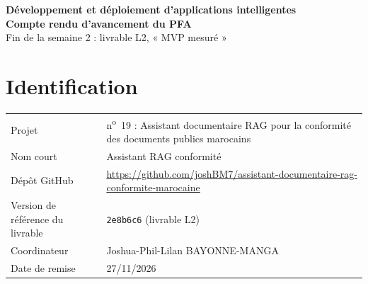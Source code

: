 \documentclass[11pt,a4paper]{article}
\newcommand{\NomCourt}{Assistant RAG conformité}
\newcommand{\NumProjet}{n\textsuperscript{o}~19}
\newcommand{\IntituleProjet}{Assistant documentaire RAG pour la conformité des documents publics marocains}
\newcommand{\Depot}{https://github.com/joshBM7/assistant-documentaire-rag-conformite-marocaine}
\newcommand{\CommitRef}{\texttt{2e8b6c6} (livrable L2)}
\newcommand{\DateRemise}{27/11/2026}
\newcommand{\Coordinateur}{Joshua-Phil-Lilan BAYONNE-MANGA}
\newif\ifconsignes
\begin{document}
\begin{center}
  {\small\color{accent}\bfseries Développement et déploiement d'applications intelligentes}\\[4pt]
  {\LARGE\bfseries\color{encre} Compte rendu d'avancement du PFA}\\[4pt]
  {\large\color{encre} Fin de la semaine 2 : livrable L2, « MVP mesuré »}
\end{center}

\ifconsignes
\begin{consigne}
\textbf{Consignes (à masquer avant la remise avec \texttt{\textbackslash consignesfalse}).}
Ce compte rendu justifie l'avancement du projet à la fin de la semaine 2. Il sert de support
à la note de suivi de cette semaine (10 points) : livrable démontré (5 points), compte rendu
tenu et honnête (2,5 points), contribution par membre (2,5 points).
\begin{itemize}
  \item \textbf{Longueur :} 4 pages maximum, hors annexes. Des phrases courtes, des chiffres, des liens.
  \item \textbf{Preuves :} chaque affirmation renvoie à un commit, une \emph{pull request}, une
        exécution de la CI ou une capture. Une ligne sans preuve compte comme non faite.
  \item \textbf{Honnêteté :} un retard expliqué vaut mieux qu'un retard caché. Les écarts se
        déclarent à la rubrique~\ref{sec:ecarts}.
  \item \textbf{Remise :} PDF déposé dans le dépôt, fichier \texttt{docs/compte-rendu-semaine2.pdf},
        au plus tard à la fin de la semaine 2.
\end{itemize}
\end{consigne}
\fi

\section{Identification}

\begin{tabularx}{\linewidth}{@{}P{4.6cm}L@{}}
\toprule
Projet & \NumProjet{} : \IntituleProjet \\
Nom court & \NomCourt \\
Dépôt GitHub & \url{\Depot} \\
Version de référence du livrable & \CommitRef \\
Coordinateur & \Coordinateur \\
Date de remise & \DateRemise \\
\bottomrule
\end{tabularx}
\end{document}
